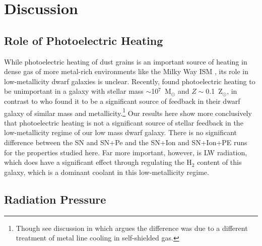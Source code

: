 \documentclass[twocolumn]{aastex62}
\newcommand{\aje}[1]{\textcolor{blue}{\textbf{(AJE: #1)}}}
\begin{document}


\section{Discussion}

\subsection{Role of Photoelectric Heating}

While photoelectric heating of dust grains is an important source of heating in dense gas of more metal-rich environments like the Milky Way ISM \citep[e.g.][]{BakesTielens1994,Wolfire2003}, its role in low-metallicity dwarf galaxies is unclear. Recently, \cite{Hu2017} found photoelectric heating to be unimportant in a galaxy with stellar mass $\sim$10$^{7}$~M$_{\odot}$ and $Z\sim$0.1~Z$_{\odot}$, in contrast to \cite{Forbes2016} who found it to be a significant source of feedback in their dwarf galaxy of similar mass and metallicity.\footnote{Though see discussion in \cite{Hu2017} which argues the difference was due to a different treatment of metal line cooling in self-shielded gas.} Our results here show more conclusively that photoelectric heating is not a significant source of stellar feedback in the low-metallicity regime of our low mass dwarf galaxy. There is no significant difference between the SN and SN+Pe and the SN+Ion and SN+Ion+PE runs for the properties studied here. Far more important, however, is LW radiation, which does have a significant effect through regulating the H$_2$ content of this galaxy, which is a dominant coolant in this low-metallicity regime. 

\subsection{Radiation Pressure}
\end{document}
